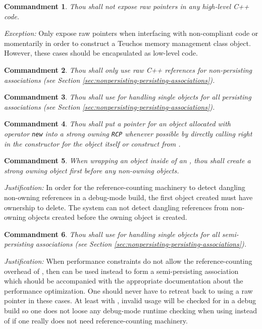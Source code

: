 \documentclass[pdf,ps2pdf,11pt]{SANDreport}
\newtheorem{commandment}{Commandment}
\begin{document}
\begin{commandment}
Thou shall not expose raw pointers in any high-level C++ code.
\end{commandment}

{}\textit{Exception:} Only expose raw pointers when interfacing with
non-compliant code or momentarily in order to construct a Teuchos
memory management class object.  However, these cases should be
encapsulated as low-level code.

\begin{commandment}
Thou shall only use raw C++ references for non-persisting associations
(see Section {}\ref{sec:nonpersisting-persisting-associations}).
\end{commandment}

\begin{commandment}
Thou shall use {} for handling single objects for all
persisting associations (see Section
{}\ref{sec:nonpersisting-persisting-associations}).
\end{commandment}

\begin{commandment}\label{cmnd:rcp-new}
Thou shall put a pointer for an object allocated with operator
{}\texttt{new} into a strong owning {}\texttt{RCP} whenever possible
by directly calling {} right in the constructor for the
{} object itself or construct from {}.
\end{commandment}

\begin{commandment}\label{cmnd:owning-rcp-first}
When wrapping an object inside of an {}, thou shall create
a strong owning {} object first before any non-owning
{} objects.
\end{commandment}
{}\textit{Justification:} In order for the reference-counting
machinery to detect dangling non-owning references in a debug-mode
build, the first {} object created must have ownership to
delete.  The system can not detect dangling references from non-owning
{} objects created before the owning
{} object is created.

\begin{commandment}\label{cmnd:ptr-semi-persisting}
Thou shall use {} for handling single objects for all
semi-persisting associations (see Section
{}\ref{sec:nonpersisting-persisting-associations}).
\end{commandment}
{}\textit{Justification:} When performance constraints do not allow
the reference-counting overhead of {}, then {} can
be used instead to form a semi-persisting association which should be
accompanied with the appropriate documentation about the performance
optimization.  One should never have to retreat back to using a raw
pointer in these cases.  At least with {}, invalid usage will
be checked for in a debug build so one does not loose any debug-mode
runtime checking when using {} instead of {} if one
really does not need reference-counting machinery.
\end{document}
